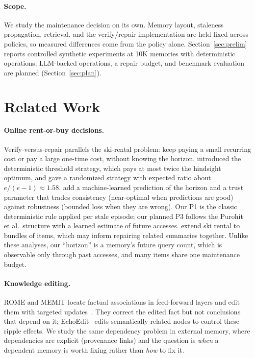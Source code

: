 \documentclass{article}
\begin{document}
\paragraph{Scope.} We study the maintenance decision on its own. Memory layout,
staleness propagation, retrieval, and the verify/repair implementation are held
fixed across policies, so measured differences come from the policy alone.
Section~\ref{sec:prelim} reports controlled synthetic experiments at 10K
memories with deterministic operations; LLM-backed operations, a repair budget,
and benchmark evaluation are planned (Section~\ref{sec:plan}).

\section{Related Work}

\paragraph{Online rent-or-buy decisions.} Verify-versus-repair parallels the
ski-rental problem: keep paying a small recurring cost or pay a large one-time
cost, without knowing the horizon. \citet{karlin1988snoopy} introduced the
deterministic threshold strategy, which pays at most twice the hindsight
optimum, and \citet{karlin1994randomized} gave a randomized strategy with
expected ratio about $e/(e-1)\approx1.58$. \citet{purohit2018improving} add a
machine-learned prediction of the horizon and a trust parameter that trades
consistency (near-optimal when predictions are good) against robustness
(bounded loss when they are wrong). Our P1 is the classic deterministic rule
applied per stale episode; our planned P3 follows the Purohit et al.\ structure
with a learned estimate of future accesses. \citet{li2025combinatorial} extend
ski rental to bundles of items, which may inform repairing related summaries
together. Unlike these analyses, our ``horizon'' is a memory's future query
count, which is observable only through past accesses, and many items share
one maintenance budget.

\paragraph{Knowledge editing.} ROME and MEMIT locate factual associations in
feed-forward layers and edit them with targeted
updates~\citep{meng2022rome,meng2023memit}. They correct the edited fact but
not conclusions that depend on it; EchoEdit~\citep{shi2026echoedit} edits
semantically related nodes to control these ripple effects. We study the same
dependency problem in external memory, where dependencies are explicit
(provenance links) and the question is \emph{when} a dependent memory is worth
fixing rather than \emph{how} to fix it.
\end{document}
